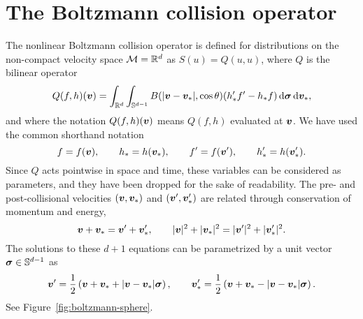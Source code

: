 \section{The Boltzmann collision operator} \label{sec:boltzmann-intro}

The nonlinear Boltzmann collision operator is defined for distributions on the non-compact velocity space
$\mathcal{M}=\mathbb{R}^d$ as $S(u)=Q(u,u)$, where $Q$ is the bilinear operator
\begin{equation} \label{eqn:Q-std}
  Q(f,h)({\bm v}) = \int_{\mathbb{R}^d}\int_{\mathbb{S}^{d-1}}
  B(|{\bm v}-{\bm v}_*|,\cos\theta)(h_*'f'-h_*f)\,\mathrm{d}{\bm\sigma} \,\mathrm{d} {\bm v}_*, 
\end{equation}
and where the notation $Q(f,h)({\bm v})$ means $Q(f,h)$ evaluated at ${\bm v}$. We have used the common shorthand
notation 
\[
    f=f({\bm v}),\qquad h_*=h({\bm v}_*),\qquad f'=f({\bm v}'),\qquad h_*' = h({\bm v}_*'). 
\]
Since $Q$ acts pointwise in space and time, these variables can be considered as parameters, and they have
been dropped for the sake of readability. The pre- and post-collisional velocities $({\bm v},{\bm v}_{*})$ and
$({\bm v}',{\bm v}_{*}')$ are related through conservation of momentum and energy,
\[
    {\bm v}+{\bm v}_\ast = {\bm v}'+{\bm v}_\ast', \qquad |{\bm v}|^2 + |{\bm v}_\ast|^2 = |{\bm v}'|^2 + |{\bm v}_\ast'|^2.
\]
The solutions to these $d+1$ equations can be parametrized by a unit vector ${\bm\sigma} \in \mathbb{S}^{d-1}$ as
\[ 
    {\bm v}' = \frac{1}{2}\left({\bm v}+{\bm v}_*+|{\bm v}-{\bm v}_*|{\bm\sigma}\right),\qquad
    {\bm v}_*' = \frac{1}{2}\left({\bm v}+{\bm v}_*-|{\bm v}-{\bm v}_*|{\bm\sigma}\right).
\]
See Figure~\ref{fig:boltzmann-sphere}.

